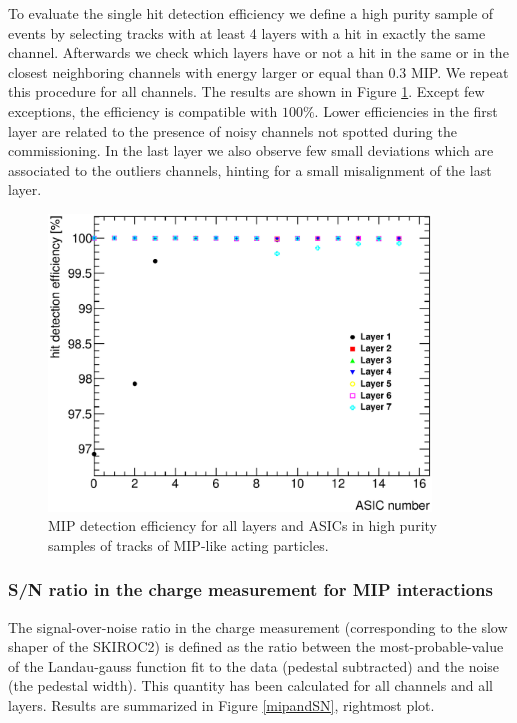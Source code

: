 \documentclass[a4paper,11pt]{article}
\begin{document}
To evaluate 
the single hit detection efficiency we define a high purity sample of
events by selecting
tracks with at least 4 layers with a hit in exactly the same channel. Afterwards we 
check which layers have or not a hit in the same or in the closest neighboring channels with energy larger or equal than 0.3 MIP.
We repeat this procedure for all channels.
The results are shown in Figure \ref{efficiency}. Except few exceptions, the efficiency is 
compatible with $100\%$.
Lower efficiencies in the first layer are related to the presence of
noisy channels not spotted during the commissioning. In the last layer we also observe few small deviations
which are associated to the outliers channels, hinting for a small misalignment of the last layer.

\begin{figure}[!t]
  \centering 
  \includegraphics[width=4in]{../figs/MIP/efficiency_nhits4_chips.eps}
  \caption{MIP detection efficiency for all layers and ASICs in high purity samples of tracks of MIP-like acting particles.}
\label{efficiency}
\end{figure}


\subsubsection{S/N ratio in the charge measurement for MIP interactions}
\label{sec:sn}

The signal-over-noise ratio in the charge measurement (corresponding to the slow shaper of the SKIROC2) is defined 
as the ratio between the most-probable-value of
the Landau-gauss function fit to the data (pedestal subtracted) and the noise (the pedestal width). This quantity 
has been calculated for all channels and all layers. 
Results are summarized in Figure \ref{mipandSN}, rightmost plot.
\end{document}
